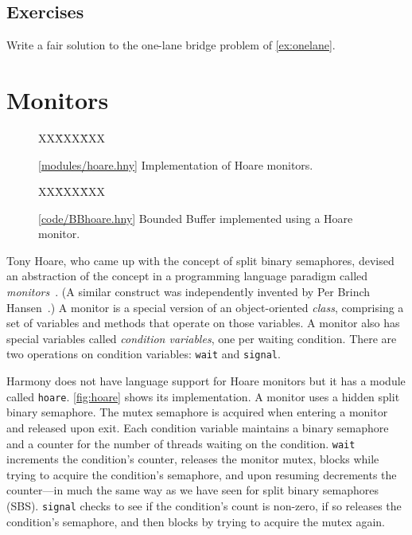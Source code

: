 \documentclass{report}
\newcommand{\harmonysource}[1]{
\begin{tabbing}
XX\=XXX\=XXX\kill
    
\end{tabbing}
}
\newcommand{\harmonylink}[1]{%
[\href{https://harmony.cs.cornell.edu/#1}{\underline{#1}}]%
}
\newenvironment{code}{
\tcolorbox
}{
\endtcolorbox
}
\begin{document}
\section*{Exercises}
\begin{problems}
\item Write a fair solution to the one-lane bridge problem of
\autoref{ex:onelane}.
\end{problems}

\chapter{Monitors}
\label{ch:monitors}

%
%

\begin{figure}
\begin{code}
\harmonysource{hoare}
\end{code}
\caption{\harmonylink{modules/hoare.hny} Implementation of Hoare monitors.}
\label{fig:hoare}
\end{figure}

\begin{figure}
\begin{code}
\harmonysource{BBhoare}
\end{code}
\caption{\harmonylink{code/BBhoare.hny} Bounded Buffer implemented using
a Hoare monitor.}
\label{fig:hoaretest}
\end{figure}

Tony Hoare, who came up with the concept of split binary semaphores, devised
an abstraction of the concept in a programming language paradigm called
\emph{monitors}~\cite{Hoare74}.
%
(A similar construct was independently invented by Per Brinch Hansen~\cite{BH73}.)
A monitor is a special version of an object-oriented \emph{class}, comprising
a set of variables and methods that operate on those variables.
A monitor also has special variables called \emph{condition variables},
one per waiting condition.
There are two operations on condition variables: \texttt{wait}
%
and
\texttt{signal}.
%

Harmony does not have language support for Hoare monitors but it
has a module called \texttt{hoare}.
\autoref{fig:hoare} shows its implementation.
A monitor uses a hidden split binary semaphore.
The mutex semaphore is acquired when entering a monitor and released
upon exit.
Each condition variable maintains a binary semaphore and a counter for
the number of threads waiting on the condition.
\texttt{wait} increments the condition's counter, releases the monitor mutex,
blocks while trying to acquire the condition's semaphore, and upon resuming
decrements the counter---in much the same way as we have seen for split binary
semaphores (SBS).
\texttt{signal} checks to see if the condition's count is non-zero, if so
releases the condition's semaphore,
and then blocks by trying to acquire the mutex again.
\end{document}

